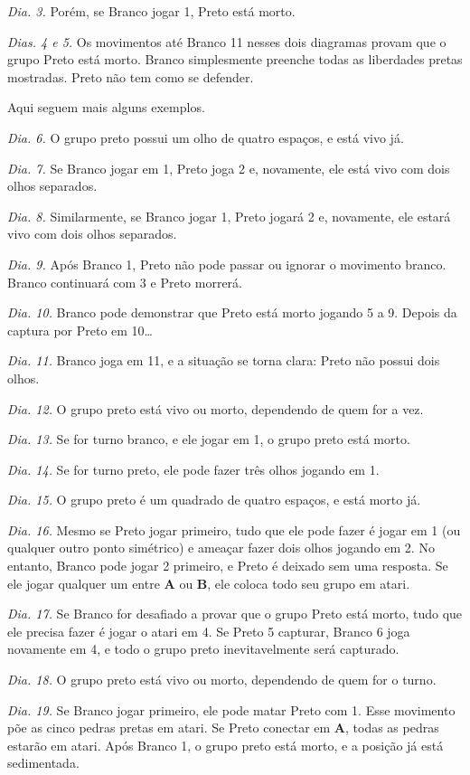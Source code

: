 \emph{Dia. 3.} Porém, se Branco jogar 1, Preto está morto.

\emph{Dias. 4 e 5.} Os movimentos até Branco 11 nesses dois diagramas provam que o grupo Preto está morto. Branco simplesmente preenche todas as liberdades pretas mostradas. Preto não tem como se defender.

Aqui seguem mais alguns exemplos.

\emph{Dia. 6.} O grupo preto possui um olho de quatro espaços, e está vivo já.

\emph{Dia. 7.} Se Branco jogar em 1, Preto joga 2 e, novamente, ele está vivo com dois olhos separados.

\emph{Dia. 8.} Similarmente, se Branco jogar 1, Preto jogará 2 e, novamente, ele estará vivo com dois olhos separados.

\emph{Dia. 9.} Após Branco 1, Preto não pode passar ou ignorar o movimento branco. Branco continuará com 3 e Preto morrerá.

\emph{Dia. 10.} Branco pode demonstrar que Preto está morto jogando 5 a 9. Depois da captura por Preto em 10\ldots

\emph{Dia. 11.} Branco joga em 11, e a situação se torna clara: Preto não possui dois olhos.

\emph{Dia. 12.} O grupo preto está vivo ou morto, dependendo de quem for a vez.

\emph{Dia. 13.} Se for turno branco, e ele jogar em 1, o grupo preto está morto.

\emph{Dia. 14.} Se for turno preto, ele pode fazer três olhos jogando em 1.

\emph{Dia. 15.} O grupo preto é um quadrado de quatro espaços, e está morto já.

\emph{Dia. 16.} Mesmo se Preto jogar primeiro, tudo que ele pode fazer é jogar em 1 (ou qualquer outro ponto simétrico) e ameaçar fazer dois olhos jogando em 2. No entanto, Branco pode jogar 2 primeiro, e Preto é deixado sem uma resposta. Se ele jogar qualquer um entre \textbf{A} ou \textbf{B}, ele coloca todo seu grupo em atari.

\emph{Dia. 17.} Se Branco for desafiado a provar que o grupo Preto está morto, tudo que ele precisa fazer é jogar o atari em 4. Se Preto 5 capturar, Branco 6 joga novamente em 4, e todo o grupo preto inevitavelmente será capturado.

\emph{Dia. 18.} O grupo preto está vivo ou morto, dependendo de quem for o turno.

\emph{Dia. 19.} Se Branco jogar primeiro, ele pode matar Preto com 1. Esse movimento põe as cinco pedras pretas em atari. Se Preto conectar em \textbf{A}, todas as pedras estarão em atari. Após Branco 1, o grupo preto está morto, e a posição já está sedimentada.

